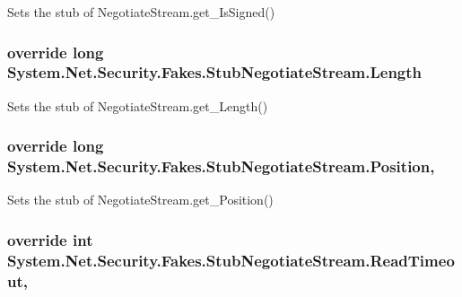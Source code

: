 Sets the stub of Negotiate\-Stream.\-get\-\_\-\-Is\-Signed()

\hypertarget{class_system_1_1_net_1_1_security_1_1_fakes_1_1_stub_negotiate_stream_a7844e48f990f5f2c66eb17c6c1def931}{
\subsubsection[{Length}]{\setlength{\rightskip}{0pt plus 5cm}override long System.\-Net.\-Security.\-Fakes.\-Stub\-Negotiate\-Stream.\-Length\hspace{0.3cm}{\ttfamily [get]}}}\label{class_system_1_1_net_1_1_security_1_1_fakes_1_1_stub_negotiate_stream_a7844e48f990f5f2c66eb17c6c1def931}


Sets the stub of Negotiate\-Stream.\-get\-\_\-\-Length()

\hypertarget{class_system_1_1_net_1_1_security_1_1_fakes_1_1_stub_negotiate_stream_acd2c685315bd0920f4b6af9b7fce9118}{
\subsubsection[{Position}]{\setlength{\rightskip}{0pt plus 5cm}override long System.\-Net.\-Security.\-Fakes.\-Stub\-Negotiate\-Stream.\-Position\hspace{0.3cm}{\ttfamily [get]}, {\ttfamily [set]}}}\label{class_system_1_1_net_1_1_security_1_1_fakes_1_1_stub_negotiate_stream_acd2c685315bd0920f4b6af9b7fce9118}


Sets the stub of Negotiate\-Stream.\-get\-\_\-\-Position()

\hypertarget{class_system_1_1_net_1_1_security_1_1_fakes_1_1_stub_negotiate_stream_ac1db99bc5cfccc29173356f0c64a86cd}{
\subsubsection[{Read\-Timeout}]{\setlength{\rightskip}{0pt plus 5cm}override int System.\-Net.\-Security.\-Fakes.\-Stub\-Negotiate\-Stream.\-Read\-Timeout\hspace{0.3cm}{\ttfamily [get]}, {\ttfamily [set]}}}\label{class_system_1_1_net_1_1_security_1_1_fakes_1_1_stub_negotiate_stream_ac1db99bc5cfccc29173356f0c64a86cd}


